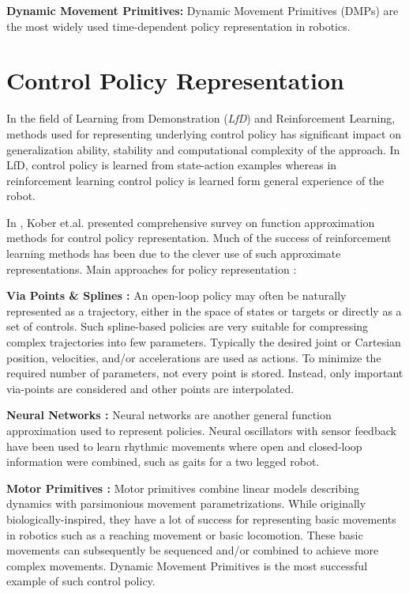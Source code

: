 \textbf{Dynamic Movement Primitives:} Dynamic Movement Primitives (DMPs) are the most widely used time-dependent policy representation in robotics. 
\newline


\section{Control Policy Representation} 
In the field of Learning from Demonstration (\textit{LfD}) and Reinforcement Learning, methods used for representing underlying control policy has significant impact on generalization ability, stability and computational complexity of the approach. In LfD, control policy is learned from state-action examples whereas in reinforcement learning control policy is learned form general experience of the robot. 


In \cite{kober2013reinforcement}, Kober et.al. presented comprehensive survey on function approximation methods for control policy representation. Much of the success of reinforcement learning methods has been due to the clever use of such approximate representations. Main approaches for policy representation : 


\textbf{Via Points \& Splines :} An open-loop policy may often be naturally represented as a trajectory, either in the space of states or targets or directly as a set of controls. Such spline-based policies are very suitable for compressing complex trajectories into few parameters. Typically the desired joint or Cartesian position, velocities, and/or accelerations are used as actions. To minimize the required number of parameters, not every point is stored. Instead, only important via-points are considered and other points are interpolated.

\textbf{Neural Networks : } Neural networks are another general function approximation used to represent policies. Neural oscillators with sensor feedback have been used to learn rhythmic movements where open and closed-loop information were combined, such as gaits for a two legged robot.

\textbf{Motor Primitives :} Motor primitives combine linear models describing dynamics with parsimonious movement parametrizations. While originally biologically-inspired, they have a lot of success for representing basic movements in robotics such as a reaching movement or basic locomotion. These basic movements can subsequently be sequenced and/or combined to achieve more complex movements. Dynamic Movement Primitives is the most successful example of such control policy. 

